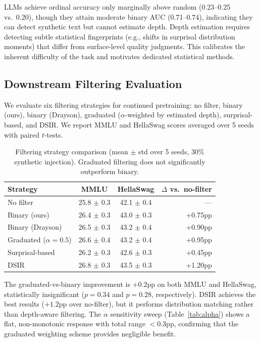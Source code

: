 \documentclass[11pt]{article}
\begin{document}
LLMs achieve ordinal accuracy only marginally above random (0.23--0.25 vs.\ 0.20), though they attain moderate binary AUC (0.71--0.74), indicating they can detect synthetic text but cannot estimate depth. Depth estimation requires detecting subtle statistical fingerprints (e.g., shifts in surprisal distribution moments) that differ from surface-level quality judgments. This calibrates the inherent difficulty of the task and motivates dedicated statistical methods.

\subsection{Downstream Filtering Evaluation}
\label{sec:filtering}

We evaluate six filtering strategies for continued pretraining: no filter, binary (ours), binary (Drayson), graduated ($\alpha$-weighted by estimated depth), surprisal-based, and DSIR. We report MMLU and HellaSwag scores averaged over 5 seeds with paired $t$-tests.

\begin{table}[h]
\centering
\caption{Filtering strategy comparison (mean $\pm$ std over 5 seeds, 30\% synthetic injection). Graduated filtering does not significantly outperform binary.}
\label{tab:filtering}
\begin{tabular}{lccr}
\toprule
Strategy & MMLU & HellaSwag & $\Delta$ vs.\ no-filter \\
\midrule
No filter & 25.8 $\pm$ 0.3 & 42.1 $\pm$ 0.4 & --- \\
Binary (ours) & 26.4 $\pm$ 0.3 & 43.0 $\pm$ 0.3 & +0.75pp \\
Binary (Drayson) & 26.5 $\pm$ 0.3 & 43.2 $\pm$ 0.4 & +0.90pp \\
Graduated ($\alpha{=}0.5$) & 26.6 $\pm$ 0.4 & 43.2 $\pm$ 0.4 & +0.95pp \\
Surprisal-based & 26.2 $\pm$ 0.3 & 42.6 $\pm$ 0.3 & +0.45pp \\
DSIR & 26.8 $\pm$ 0.3 & 43.5 $\pm$ 0.3 & +1.20pp \\
\bottomrule
\end{tabular}
\end{table}

The graduated-vs-binary improvement is $+0.2$pp on both MMLU and HellaSwag, statistically insignificant ($p = 0.34$ and $p = 0.28$, respectively). DSIR achieves the best results ($+1.2$pp over no-filter), but it performs distribution matching rather than depth-aware filtering. The $\alpha$ sensitivity sweep (Table~\ref{tab:alpha}) shows a flat, non-monotonic response with total range $< 0.3$pp, confirming that the graduated weighting scheme provides negligible benefit.
\end{document}
